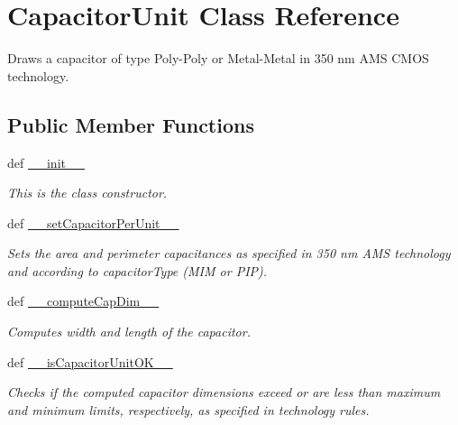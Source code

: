 \hypertarget{classpython_1_1CapacitorUnit_1_1CapacitorUnit}{\section{Capacitor\-Unit Class Reference}
\label{classpython_1_1CapacitorUnit_1_1CapacitorUnit}
}


Draws a capacitor of type Poly-\/\-Poly or Metal-\/\-Metal in 350 nm A\-M\-S C\-M\-O\-S technology.  


\subsection*{Public Member Functions}
\begin{DoxyCompactItemize}
\item 
def \hyperlink{classpython_1_1CapacitorUnit_1_1CapacitorUnit_ac775ee34451fdfa742b318538164070e}{\-\_\-\-\_\-init\-\_\-\-\_\-}
\begin{DoxyCompactList}\small\item\em This is the class constructor. \end{DoxyCompactList}\item 
def \hyperlink{classpython_1_1CapacitorUnit_1_1CapacitorUnit_a217d8871ff92e0ad45001492875261e1}{\-\_\-\-\_\-set\-Capacitor\-Per\-Unit\-\_\-\-\_\-}
\begin{DoxyCompactList}\small\item\em Sets the area and perimeter capacitances as specified in 350 nm A\-M\-S technology and according to {\ttfamily capacitor\-Type} (M\-I\-M or P\-I\-P). \end{DoxyCompactList}\item 
def \hyperlink{classpython_1_1CapacitorUnit_1_1CapacitorUnit_a914a2dadb095ebca95a60ee5c8ddd7a0}{\-\_\-\-\_\-compute\-Cap\-Dim\-\_\-\-\_\-}
\begin{DoxyCompactList}\small\item\em Computes width and length of the capacitor. \end{DoxyCompactList}\item 
def \hyperlink{classpython_1_1CapacitorUnit_1_1CapacitorUnit_ac114a243874b413707b6fa7d30529d76}{\-\_\-\-\_\-is\-Capacitor\-Unit\-O\-K\-\_\-\-\_\-}
\begin{DoxyCompactList}\small\item\em Checks if the computed capacitor dimensions exceed or are less than maximum and minimum limits, respectively, as specified in technology rules. \end{DoxyCompactList}\item 

\end{DoxyCompactItemize}
